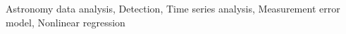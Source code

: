 \documentclass[]{article}
\begin{document}
Astronomy data analysis, Detection, Time series analysis, Measurement error model, Nonlinear regression
\end{document}
